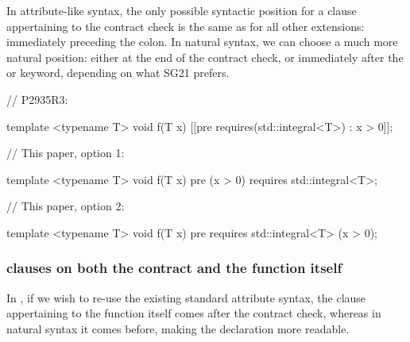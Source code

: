 In attribute-like syntax, the only possible syntactic position for a   clause appertaining to the contract check is the same as for all other extensions: immediately preceding the colon. In natural syntax, we can choose a much more natural position: either at the end of the contract check, or immediately after the  or  keyword, depending on what SG21 prefers.


\begin{minipage}[t]{8.7cm}
\begin{codeblock}
// P2935R3:

template <typename T>
void f(T x)
  [[pre requires(std::integral<T>) : x > 0]];
\end{codeblock}
\end{minipage}
\begin{minipage}[t]{8cm}
\begin{codeblock}
// This paper, option 1:

template <typename T>
void f(T x)
  pre (x > 0) requires std::integral<T>;
\end{codeblock}
\end{minipage}

\begin{minipage}[t]{8.7cm}
\phantom{x}
\end{minipage}
\begin{minipage}[t]{8cm}
\begin{codeblock}
// This paper, option 2:

template <typename T>
void f(T x)
  pre requires std::integral<T> (x > 0);
\end{codeblock}
\end{minipage}


\subsubsection{ clauses on both the contract and the function itself}

In \cite{P2935R3}, if we wish to re-use the existing standard attribute syntax, the  clause appertaining to the function itself comes after the contract check, whereas in natural syntax it comes before, making the declaration more readable.

